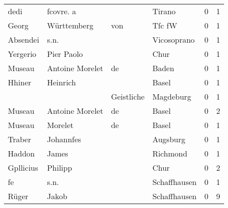 \begin{center}
\begin{tiny}
\begin{longtabu}{llllrr}
                     dedi &                          fcovre. a &             &                                      Tirano &          0 &         1 \\
                    Georg &                        Württemberg &         von &                                      Tfc fW &          0 &         1 \\
                 Absendei &                               s.n. &             &                                 Vicosoprano &          0 &         1 \\
                 Yergerio &                         Pier Paolo &             &                                        Chur &          0 &         1 \\
                   Museau &                    Antoine Morelet &          de &                                       Baden &          0 &         1 \\
                   Hhiner &                           Heinrich &             &                                       Basel &          0 &         1 \\
                          &                                    &  Geistliche &                                   Magdeburg &          0 &         1 \\
                   Museau &                    Antoine Morelet &          de &                                       Basel &          0 &         2 \\
                   Museau &                            Morelet &          de &                                       Basel &          0 &         1 \\
                   Traber &                          Johannfes &             &                                    Augsburg &          0 &         1 \\
                   Haddon &                              James &             &                                    Richmond &          0 &         1 \\
                Gpllicius &                            Philipp &             &                                        Chur &          0 &         2 \\
                       fe &                               s.n. &             &                                Schaffhausen &          0 &         1 \\
                    Rüger &                              Jakob &             &                                Schaffhausen &          0 &         9 \\

\end{longtabu}
\end{tiny}
\end{center}
